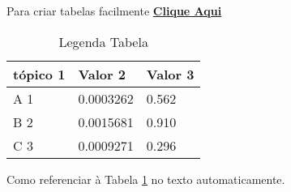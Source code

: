 


        Para criar tabelas facilmente \href{https://www.tablesgenerator.com/}{\textbf{Clique Aqui}}

        \begin{table}[h]  %
            \caption{Legenda Tabela}
            \label{tab:exemplo}             %

            \centering
            \begin{tabular}{l l l}
                \toprule
                \textbf{tópico 1} & \textbf{Valor 2} & \textbf{Valor 3}\\
                \midrule
                A 1 & 0.0003262 & 0.562 \\
                B 2 & 0.0015681 & 0.910 \\
                C 3 & 0.0009271 & 0.296 \\
                \bottomrule
            \end{tabular}
        \end{table}  %



    Como referenciar à Tabela  \ref{tab:exemplo} no texto automaticamente.



\newcommand{\corLN}{blue!30}
\newcommand{\corLT}{green!30}
\newcommand{\corLA}{orange!50} %
\newcommand{\corFS}{orange!20}
\newcommand{\corFQ}{yellow!20}
\newcommand{\corFM}{blue!20}
\newcommand{\corAL}{gray!20}







